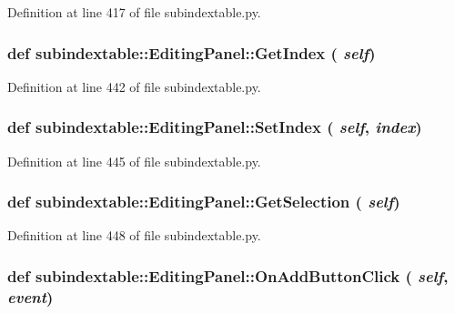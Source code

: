 Definition at line 417 of file subindextable.py.\hypertarget{classsubindextable_1_1EditingPanel_7f59673c3d822f36c779243c03135262}{
\subsubsection[GetIndex]{\setlength{\rightskip}{0pt plus 5cm}def subindextable::Editing\-Panel::Get\-Index ( {\em self})}}
\label{classsubindextable_1_1EditingPanel_7f59673c3d822f36c779243c03135262}




Definition at line 442 of file subindextable.py.\hypertarget{classsubindextable_1_1EditingPanel_bcf8af059e66a142de9427beecebf9da}{
\subsubsection[SetIndex]{\setlength{\rightskip}{0pt plus 5cm}def subindextable::Editing\-Panel::Set\-Index ( {\em self},  {\em index})}}
\label{classsubindextable_1_1EditingPanel_bcf8af059e66a142de9427beecebf9da}




Definition at line 445 of file subindextable.py.\hypertarget{classsubindextable_1_1EditingPanel_a1f495ac1fcfb50274c9d72b19be5eff}{
\subsubsection[GetSelection]{\setlength{\rightskip}{0pt plus 5cm}def subindextable::Editing\-Panel::Get\-Selection ( {\em self})}}
\label{classsubindextable_1_1EditingPanel_a1f495ac1fcfb50274c9d72b19be5eff}




Definition at line 448 of file subindextable.py.\hypertarget{classsubindextable_1_1EditingPanel_78884cdb11542dd4f1557b4aea4bb078}{
\subsubsection[OnAddButtonClick]{\setlength{\rightskip}{0pt plus 5cm}def subindextable::Editing\-Panel::On\-Add\-Button\-Click ( {\em self},  {\em event})}}
\label{classsubindextable_1_1EditingPanel_78884cdb11542dd4f1557b4aea4bb078}




